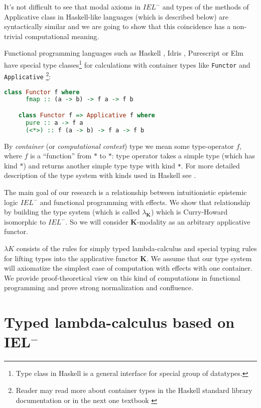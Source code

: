 \documentclass[a4paper]{article}
\begin{document}
  It's not difficult to see that modal axioms in $IEL^{-}$ and types of the methods of Applicative class in
  Haskell-like languages (which is described below) are syntactically similar and we are going to show that
  this coincidence has a
  non-trivial computational meaning.

  Functional programming languages such as Haskell \cite{Haskell}, Idris \cite{Idris}, Purescript \cite{Purs}
  or Elm \cite{Elm} have special type classes\footnote{Type class in Haskell is a general interface for
  special group of datatypes.} for calculations with container types like \verb"Functor" and
  \verb"Applicative" \footnote{Reader may read more about container types in the Haskell standard library documentation\cite{Base} or in the next one textbook
  \cite{Miran}}:

  \begin{lstlisting}[language=Haskell]
    class Functor f where
      fmap :: (a -> b) -> f a -> f b

    class Functor f => Applicative f where
      pure :: a -> f a
      (<*>) :: f (a -> b) -> f a -> f b
  \end{lstlisting}

  By \emph{container} (or \emph{computational context}) type we mean some type-operator $f$, where $f$ is a
  ``function'' from $*$ to $*$: type operator takes a simple type (which has kind $*$) and returns another
  simple type type with kind \verb"*". For more detailed description of the type system with kinds used in
  Haskell see \cite{Morten}.


  The main goal of our research is a relationship between intuitionistic epistemic logic $IEL^{-}$ and
  functional programming with effects. We show that relationship by building the type system (which is called $\lambda_{\textbf{K}}$) which is Curry-Howard isomorphic to $IEL^{-}$. So we will consider $\textbf{K}$-modality as an arbitrary applicative functor.

  $\lambda K$ consists of the rules for simply typed lambda-calculus and special typing rules for
  lifting types into the applicative functor $\textbf{K}$. We assume that our type system will
  axiomatize the simplest case of computation with effects with one container. We provide proof-theoretical
  view on
  this kind of computations in functional programming and prove strong normalization and confluence.

  \section{Typed lambda-calculus based on IEL$^{-}$}
\end{document}
